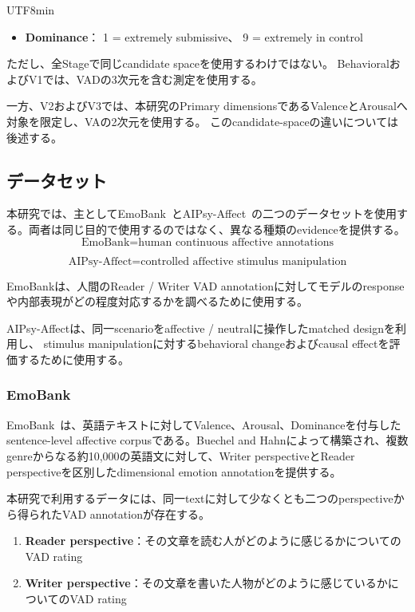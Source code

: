 \documentclass{article} %
\begin{document}
\begin{CJK*}{UTF8}{min}
\begin{itemize}
    \item \textbf{Dominance}：
    1 = extremely submissive、
    9 = extremely in control
\end{itemize}

ただし、全Stageで同じcandidate spaceを使用するわけではない。
BehavioralおよびV1では、VADの3次元を含む測定を使用する。

一方、V2およびV3では、本研究のPrimary dimensionsであるValenceとArousalへ対象を限定し、VAの2次元を使用する。
このcandidate-spaceの違いについては後述する。


\subsection{データセット}
\label{app:datasets}

本研究では、主としてEmoBank~\citep{buechel2017emobank}とAIPsy-Affect~\citep{keeman2026aipsy,keido_labs_2026}の二つのデータセットを使用する。両者は同じ目的で使用するのではなく、異なる種類のevidenceを提供する。
\[
\text{EmoBank}
=
\text{human continuous affective annotations}
\]

\[
\text{AIPsy-Affect}
=
\text{controlled affective stimulus manipulation}
\]

EmoBankは、人間のReader / Writer VAD annotationに対してモデルのresponseや内部表現がどの程度対応するかを調べるために使用する。

AIPsy-Affectは、同一scenarioをaffective / neutralに操作したmatched designを利用し、
stimulus manipulationに対するbehavioral changeおよびcausal effectを評価するために使用する。


\subsubsection{EmoBank}

EmoBank~\citep{buechel2017emobank}は、英語テキストに対してValence、Arousal、Dominanceを付与したsentence-level affective corpusである。Buechel and Hahnによって構築され、複数genreからなる約10,000の英語文に対して、Writer perspectiveとReader perspectiveを区別したdimensional emotion annotationを提供する。

本研究で利用するデータには、同一textに対して少なくとも二つのperspectiveから得られたVAD annotationが存在する。

\begin{enumerate}
    \item \textbf{Reader perspective}：その文章を読む人がどのように感じるかについてのVAD rating
    \item \textbf{Writer perspective}：その文章を書いた人物がどのように感じているかについてのVAD rating
\end{enumerate}


\end{CJK*}
\end{document}
